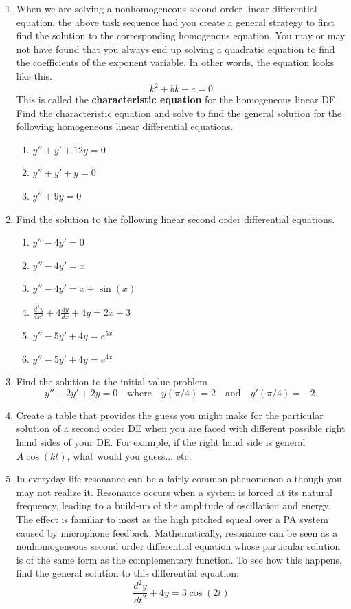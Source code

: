 \begin{enumerate}
\item When we are solving a nonhomogeneous second order linear differential equation, the above task sequence had you create a general strategy to first find the solution to the corresponding homogenous equation. You may or may not have found that you always end up solving a quadratic equation to find the coefficients of the exponent variable. In other words, the equation looks like this.
\[
k^2+bk+c=0
\]              
This is called the \textbf{characteristic equation} for the homogeneous linear DE.
Find the characteristic equation and solve to find the general solution for the following homogeneous linear differential equations. \label{13HWproblem1}
\begin{enumerate}
\item $y'' + y' + 12y = 0$
\item $y'' + y' + y = 0$
\item $y'' + 9y = 0$
\end{enumerate} 

\item Find the solution to the following linear second order differential equations. \label{13HWproblem2}
\begin{enumerate}
\item $y'' -4y' = 0$
\item $y'' -4y' = x$
\item $y'' -4y' = x + \sin(x)$
\item $\displaystyle\frac{d^2y}{dx^2}+4\frac{dy}{dx}+4y=2x+3$
\item $y'' - 5y' + 4y = e^{5x}$
\item $y'' - 5y' + 4y = e^{4x}$
\end{enumerate}

\item Find the solution to the initial value problem \label{13HWproblem3}
\[
y''+2y'+2y=0 \quad \text{where} \quad y(\pi/4)=2 \quad \text{and} \quad y'(\pi/4)=-2.
\]

\item Create a table that provides the guess you might make for the particular solution of a second order DE when you are faced with different possible right hand sides of your DE. For example, if the right hand side is general $A\cos(kt)$, what would you guess... etc. \label{13HWproblem4}

\item In everyday life resonance can be a fairly common phenomenon although you may not realize it. Resonance occurs when a system is forced at its natural frequency, leading to a build-up of the amplitude of oscillation and energy. The effect is familiar to most as the high pitched squeal over a PA system caused by microphone feedback. Mathematically, resonance can be seen as a nonhomogeneous second order differential equation whose particular solution is of the same form as the complementary function. To see how this happens, find the general solution to this differential equation: \label{13HWproblem5}
\[
\frac{d^2y}{dt^2}+4y=3\cos(2t)
\]


\end{enumerate}
